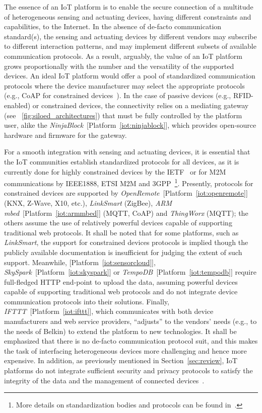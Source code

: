 \documentclass[preprint,10pt,5p]{elsarticle}
\newcommand{\citeiot}[1]{[Platform~\ref{#1}]}
\begin{document}
The essence of an IoT platform is to enable the secure connection of a
multitude of heterogeneous sensing and actuating devices, having
different constraints and capabilities, to the Internet. 
In the absence of de-facto communication standard(s), 
the sensing and actuating devices by different vendors may subscribe 
to different interaction patterns, and may implement different subsets 
of available communication protocols.
As a result, arguably, the value of an IoT platform grows proportionally 
with the number and the versatility of the supported devices. 
An ideal IoT platform would offer a
pool of standardized communication protocols where the device
manufacturer may select the appropriate protocols (e.g., CoAP for
constrained devices~\cite{Bormann2012}). 
In the case of passive devices (e.g., RFID-enabled) or constrained
devices, the connectivity relies on a mediating gateway (see 
\figurename{~\ref{fig:siloed_architectures}}) that must be fully
controlled by the platform user, alike the \emph{NinjaBlock}~\citeiot{iot:ninjablock},
which provides open-source hardware and firmware for the gateway.

For a smooth integration with sensing and actuating devices, 
it is essential that the IoT communities establish standardized
protocols for all devices, as it is currently done for highly
constrained devices by the IETF~\cite{Ishaq2013} or for M2M
communications by IEEE1888, ETSI M2M and
3GPP~\cite{Klinpratum2014}\footnote{ 
More details on standardization bodies and protocols can be found
in~\cite{Borgia2014}.}.
Presently, protocols for constrained devices are supported by
\emph{OpenRemote}~\citeiot{iot:openremote} (KNX, Z-Wave, X10, etc.), 
\emph{LinkSmart\textsuperscript{\texttrademark}} (ZigBee), 
\emph{ARM mbed}~\citeiot{iot:armmbed} (MQTT, CoAP) and \emph{ThingWorx}
(MQTT);
the others assume the use of
relatively powerful devices capable of supporting traditional web
protocols. It shall be noted that for some platforms, such as 
\emph{LinkSmart\textsuperscript{\texttrademark}}, the support for
constrained devices protocols is implied though the publicly
available documentation is insufficient for judging the extent of such
support.
Meanwhile, 
\citeiot{iot:sensorcloud}, \emph{SkySpark}~\citeiot{iot:skyspark} or
\emph{TempoDB}~\citeiot{iot:tempodb} require full-fledged HTTP
end-point to upload the data, assuming powerful devices capable of
supporting traditional web protocols and do not integrate device
communication protocols into their solutions.
Finally, \emph{IFTTT}~\citeiot{iot:ifttt}, which communicates with
both device manufacturers and web service providers,  ``adjusts'' to
the vendors' needs (e.g., to the needs of Belkin) to extend the
platform to new technologies. 
It shall be emphasized that there is no de-facto communication 
protocol suit, and this makes the task of interfacing heterogeneous 
devices more challenging and hence more expensive.
In addition, as previously mentioned in Section~\ref{sec:review}, 
IoT platforms do not integrate sufficient security and privacy protocols
to satisfy the integrity of the data and the management of connected 
devices~\cite{Roman2013,Satyadevan2015}.
\end{document}
